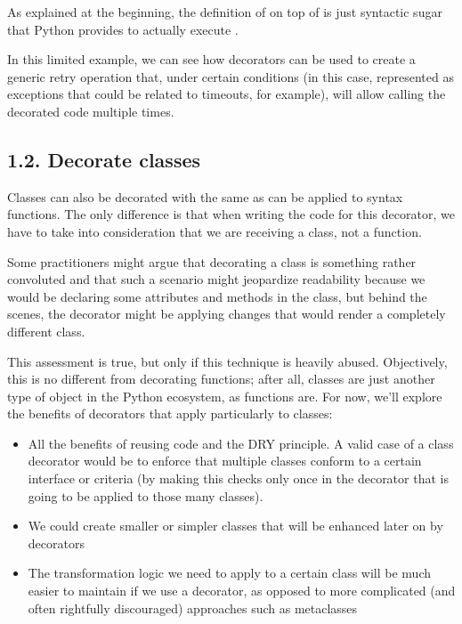 \documentclass[a4paper,10pt,english]{sphinxmanual}
\begin{document}
As explained at the beginning, the definition of  on top of  is just
syntactic sugar that Python provides to actually execute .

In this limited example, we can see how decorators can be used to create a generic retry
operation that, under certain conditions (in this case, represented as exceptions that could
be related to timeouts, for example), will allow calling the decorated code multiple times.


\subsection{1.2. Decorate classes}
\label{\detokenize{chapters/5_decorators/index:decorate-classes}}
Classes can also be decorated with the same as can be applied to syntax
functions. The only difference is that when writing the code for this decorator, we have to
take into consideration that we are receiving a class, not a function.

Some practitioners might argue that decorating a class is something rather convoluted and
that such a scenario might jeopardize readability because we would be declaring some
attributes and methods in the class, but behind the scenes, the decorator might be applying
changes that would render a completely different class.

This assessment is true, but only if this technique is heavily abused. Objectively, this is no
different from decorating functions; after all, classes are just another type of object in the
Python ecosystem, as functions are. For now, we’ll
explore the benefits of decorators that apply particularly to classes:
\begin{itemize}
\item {} 
All the benefits of reusing code and the DRY principle. A valid case of a class decorator would be to enforce that multiple classes conform to a certain interface or criteria (by making this checks only once in the decorator that is going to be applied to those many classes).

\item {} 
We could create smaller or simpler classes that will be enhanced later on by decorators

\item {} 
The transformation logic we need to apply to a certain class will be much easier to maintain if we use a decorator, as opposed to more complicated (and often rightfully discouraged) approaches such as metaclasses

\end{itemize}
\end{document}
